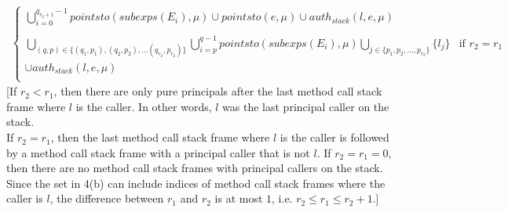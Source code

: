 \documentclass{llncs}
\newcommand{\intuition}[1]{#1}
\begin{document}
\begin{mdframed}
\begin{lemma}
\begin{align*}
\begin{cases}
    \bigcup^{q_{r_2+1}-1}_{i = 0} pointsto(subexps(E_i), \mu) \cup pointsto(e, \mu) \cup auth_{stack}(l, e, \mu)\\\\
    \bigcup_{(q, p) \in \{ (q_1, p_1), (q_2, p_2), \dots (q_{r_2}, p_{r_2}) \}} \bigcup^{q-1}_{i = p} pointsto(subexps(E_i), \mu) \bigcup_{j \in \{ p_1, p_2, \dots, p_{r_2} \}} \{ l_j \} & \text{if } r_2 = r_1\\
    \cup auth_{stack}(l, e, \mu)\\
\end{cases}
\end{align*}
\intuition{[If $r_2 < r_1$, then there are only pure principals after the last method call stack frame where $l$ is the caller. In other words, $l$ was the last principal caller on the stack.\\
If $r_2 = r_1$, then the last method call stack frame where $l$ is the caller is followed by a method call stack frame with a principal caller that is not $l$. If $r_2 = r_1 = 0$, then there are no method call stack frames with principal callers on the stack.\\
Since the set in 4(b) can include indices of method call stack frames where the caller is $l$, the difference between $r_1$ and $r_2$ is at most $1$, i.e. $r_2 \le r_1 \le r_2 + 1$.]}
\end{lemma}
\end{mdframed}
\end{document}
